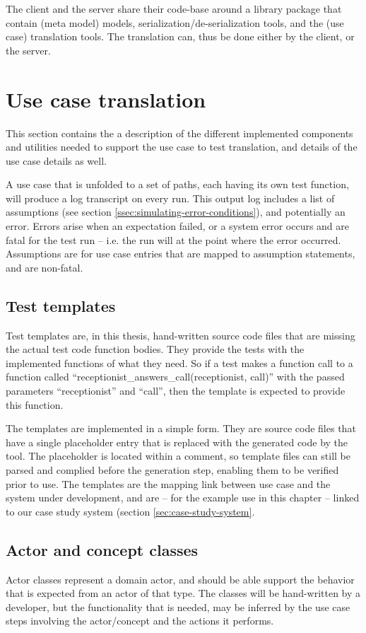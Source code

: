 \noindent The client and the server share their code-base around a library package that contain (meta model) models, serialization/de-serialization tools, and the (use case) translation tools. The translation can, thus be done either by the client, or the server.

\section{Use case translation}
This section contains the a description of the different implemented components and utilities needed to support the use case to test translation, and details of the use case details as well.\medskip

\noindent A use case that is unfolded to a set of paths, each having its own test function, will produce a log transcript on every run. This output log includes a list of assumptions (see section \ref{ssec:simulating-error-conditions}), and potentially an error. Errors arise when an expectation failed, or a system error occurs and are fatal for the test run -- i.e. the run will at the point where the error occurred. Assumptions are for use case entries that are mapped to assumption statements, and are non-fatal.

\subsection{Test templates}
Test templates are, in this thesis, hand-written source code files that are missing the actual test code function bodies. They provide the tests with the implemented functions of what they need. So if a test makes a function call to a function called ``receptionist\_answers\_call(receptionist, call)'' with the passed parameters ``receptionist'' and ``call'', then the template is expected to provide this function.\medskip

\noindent The templates are implemented in a simple form. They are source code files that have a single placeholder entry that is replaced with the generated code by the tool. The placeholder is located within a comment, so template files can still be parsed and complied before the generation step, enabling them to be verified prior to use.\medskip
The templates are the mapping link between use case and the system under development, and are -- for the example use in this chapter -- linked to our case study system (section \ref{sec:case-study-system}.

\subsection{Actor and concept classes}
Actor classes represent a domain actor, and should be able support the behavior that is expected from an actor of that type. The classes will be hand-written by a developer, but the functionality that is needed, may be inferred by the use case steps involving the actor/concept and the actions it performs.

